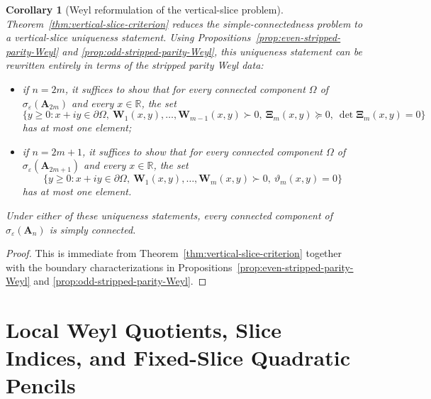 \documentclass[11pt]{article}
\newtheorem{corollary}[theorem]{Corollary}
\begin{document}
\begin{corollary}[Weyl reformulation of the vertical-slice problem]\label{cor:remaining-vertical-slice-problem}
Theorem~\ref{thm:vertical-slice-criterion} reduces the simple-connectedness problem to a vertical-slice uniqueness statement.
Using Propositions~\ref{prop:even-stripped-parity-Weyl} and \ref{prop:odd-stripped-parity-Weyl}, this uniqueness statement can be rewritten entirely in terms of the stripped parity Weyl data:

\begin{itemize}
\item if \(n=2m\), it suffices to show that for every connected component \(\Omega\) of \(\sigma_\varepsilon(\mathbf{A}_{2m})\) and every \(x\in\mathbb{R}\), the set
\[
\bigl\{y\ge 0:x+iy\in\partial\Omega,\ \mathbf{W}_1(x,y),\dots,\mathbf{W}_{m-1}(x,y)\succ 0,\ \boldsymbol{\Xi}_m(x,y)\succeq 0,\ \det \boldsymbol{\Xi}_m(x,y)=0\bigr\}
\]
has at most one element;

\item if \(n=2m+1\), it suffices to show that for every connected component \(\Omega\) of \(\sigma_\varepsilon(\mathbf{A}_{2m+1})\) and every \(x\in\mathbb{R}\), the set
\[
\bigl\{y\ge 0:x+iy\in\partial\Omega,\ \mathbf{W}_1(x,y),\dots,\mathbf{W}_m(x,y)\succ 0,\ \vartheta_m(x,y)=0\bigr\}
\]
has at most one element.
\end{itemize}

Under either of these uniqueness statements, every connected component of \(\sigma_\varepsilon(\mathbf{A}_n)\) is simply connected.
\end{corollary}

\begin{proof}
This is immediate from Theorem~\ref{thm:vertical-slice-criterion} together with the boundary characterizations in Propositions~\ref{prop:even-stripped-parity-Weyl} and \ref{prop:odd-stripped-parity-Weyl}.
\end{proof}

\section{Local Weyl Quotients, Slice Indices, and Fixed-Slice Quadratic Pencils}
\end{document}
